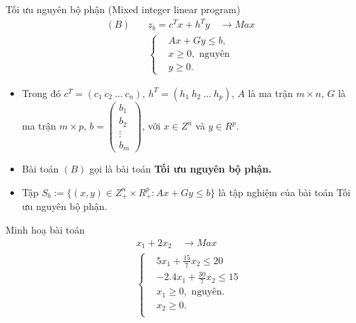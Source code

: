 \documentclass[10pt]{beamer}
\begin{document}
\begin{frame}{Tối ưu nguyên bộ phận (Mixed integer linear program)}
\begin{equation}\label{2.4}
\begin{split}
(B) \quad & z_b=c^Tx+h^Ty \quad \longrightarrow Max \\
          & \left\{\begin{split}
            &Ax+Gy \leq  b, \\
            &x \geq 0, \text{ nguyên} \\
            &y \geq 0.
            \end{split}\right.
\end{split}
\end{equation}    
\begin{itemize} \small
\item Trong đó $c^T=(c_1 \: c_2 \: \ldots \: c_n)$, $h^T=(h_1 \: h_2 \: \ldots \: h_p)$, $A$ là ma trận $m\times n$, $G$ là ma trận $m\times p$, $b=\begin{pmatrix}
    b_1 \\
    b_2 \\
    \vdots \\
    b_m
    \end{pmatrix}$, với $x\in Z^n$ và $y\in R^p$.
\item Bài toán $(B)$ gọi là bài toán \textbf{Tối ưu nguyên bộ phận.}
\item Tập $S_b:=\{(x,y)\in Z^n_+\times R^p_+: Ax+Gy\leq b\}$ là tập nghiệm của bài toán Tối ưu nguyên bộ phận.
\end{itemize}
\end{frame}
\begin{frame}{Minh hoạ bài toán}
   \begin{equation}
        \begin{split}
        \quad & x_1 + 2x_2 \quad \longrightarrow Max \\
                    & \left\{\begin{split}
                    & 5x_1 + \frac{15}{7}x_2 \leq 20 \\
                    & -2.4x_1 + \frac{30}{7}x_2 \leq 15 \\
                    &x_1 \geq 0, \text{ nguyên}. \\
                    &x_2 \geq 0. \\
                    \end{split}\right.    
        \end{split}
    \end{equation}            
\end{frame}
\end{document}
